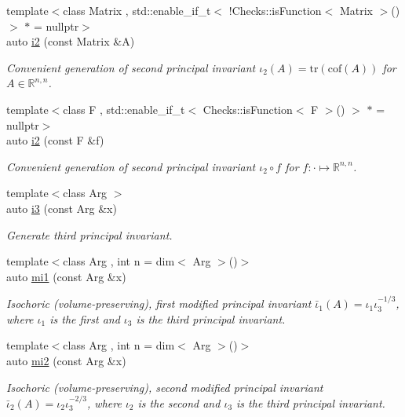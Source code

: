 \begin{DoxyCompactItemize}
{\footnotesize template$<$class Matrix , std\-::enable\-\_\-if\-\_\-t$<$ !\-Checks\-::is\-Function$<$ Matrix $>$() $>$ $\ast$  = nullptr$>$ }\\auto \hyperlink{group__InvariantGroup_ga1d46274d7b5b03321f8136c6b11bf473}{i2} (const Matrix \&A)
\begin{DoxyCompactList}\small\item\em Convenient generation of second principal invariant $ \iota_2(A)=\mathrm{tr}(\mathrm{cof}(A)) $ for $A\in\mathbb{R}^{n,n}$. \end{DoxyCompactList}\item 
{\footnotesize template$<$class F , std\-::enable\-\_\-if\-\_\-t$<$ Checks\-::is\-Function$<$ F $>$() $>$ $\ast$  = nullptr$>$ }\\auto \hyperlink{group__InvariantGroup_gaa9c14aef534cb03abd7c84b2ce36415d}{i2} (const F \&f)
\begin{DoxyCompactList}\small\item\em Convenient generation of second principal invariant $ \iota_2\circ f $ for $f:\cdot\mapsto\mathbb{R}^{n,n}$. \end{DoxyCompactList}\item 
{\footnotesize template$<$class Arg $>$ }\\auto \hyperlink{group__InvariantGroup_gab549eecd5d41cabdf6ad9d5fd5ef1207}{i3} (const Arg \&x)
\begin{DoxyCompactList}\small\item\em Generate third principal invariant. \end{DoxyCompactList}\item 
{\footnotesize template$<$class Arg , int n = dim$<$ Arg $>$()$>$ }\\auto \hyperlink{group__InvariantGroup_ga22a3d609bf5ccffa5c8c8c25c570ace6}{mi1} (const Arg \&x)
\begin{DoxyCompactList}\small\item\em Isochoric (volume-\/preserving), first modified principal invariant $ \bar\iota_1(A)=\iota_1\iota_3^{-1/3} $, where $\iota_1$ is the first and $\iota_3$ is the third principal invariant. \end{DoxyCompactList}\item 
{\footnotesize template$<$class Arg , int n = dim$<$ Arg $>$()$>$ }\\auto \hyperlink{group__InvariantGroup_gac03f2f4188cc0c6acbbcaf01c480e6e8}{mi2} (const Arg \&x)
\begin{DoxyCompactList}\small\item\em Isochoric (volume-\/preserving), second modified principal invariant $ \bar\iota_2(A)=\iota_2\iota_3^{-2/3} $, where $\iota_2$ is the second and $\iota_3$ is the third principal invariant. \end{DoxyCompactList}\item 

\end{DoxyCompactItemize}
